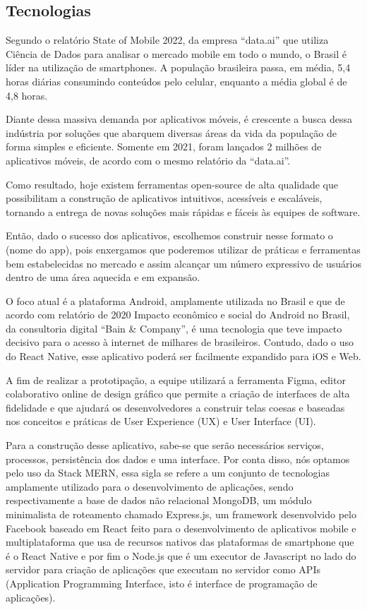\begin{apendicesenv}
	
	
	\section{Tecnologias}
	Segundo o relatório State of Mobile 2022, da empresa “data.ai” que utiliza Ciência de Dados para analisar o mercado mobile em todo o mundo, o Brasil é líder na utilização de smartphones. A população brasileira passa, em média, 5,4 horas diárias consumindo conteúdos pelo celular, enquanto a média global é de 4,8 horas. 
	
	Diante dessa massiva demanda por aplicativos móveis, é crescente a busca dessa indústria por soluções que abarquem diversas áreas da vida da população de forma simples e eficiente. Somente em 2021, foram lançados 2 milhões de aplicativos móveis, de acordo com o mesmo relatório da “data.ai”.
	
	Como resultado, hoje existem ferramentas open-source de alta qualidade que possibilitam a construção de aplicativos intuitivos, acessíveis e escaláveis, tornando a entrega de novas soluções mais rápidas e fáceis às equipes de software. 
	
	Então, dado o sucesso dos aplicativos, escolhemos construir nesse formato o (nome do app), pois enxergamos que poderemos utilizar de práticas e ferramentas bem estabelecidas no mercado e assim alcançar um número expressivo de usuários dentro de uma área aquecida e em expansão.
	
	O foco atual é a plataforma Android, amplamente utilizada no Brasil e que de acordo com relatório de 2020 Impacto econômico e social do Android no Brasil, da consultoria digital “Bain & Company”, é uma tecnologia que teve impacto decisivo para o acesso à internet de milhares de brasileiros. Contudo, dado o uso do React Native, esse aplicativo poderá ser facilmente expandido para iOS e Web.
	
	A fim de realizar a prototipação, a equipe utilizará a ferramenta Figma, editor colaborativo online de design gráfico que permite a criação de interfaces de alta fidelidade e que ajudará os desenvolvedores a construir telas coesas e baseadas nos conceitos e práticas de User Experience (UX) e User Interface (UI).
	
	Para a construção desse aplicativo, sabe-se que serão necessários serviços, processos, persistência dos dados e uma interface. Por conta disso, nós optamos pelo uso da Stack MERN, essa sigla se refere a um conjunto de tecnologias amplamente utilizado para o desenvolvimento de aplicações, sendo respectivamente a base de dados não relacional MongoDB, um módulo minimalista de roteamento chamado Express.js, um framework desenvolvido pelo Facebook baseado em React feito para o desenvolvimento de aplicativos mobile e multiplataforma que usa de recursos nativos das plataformas de smartphone que é o React Native e por fim o Node.js que é um executor de Javascript no lado do servidor para criação de aplicações que executam no servidor como APIs (Application Programming Interface, isto é interface de programação de aplicações).
	

\end{apendicesenv}
